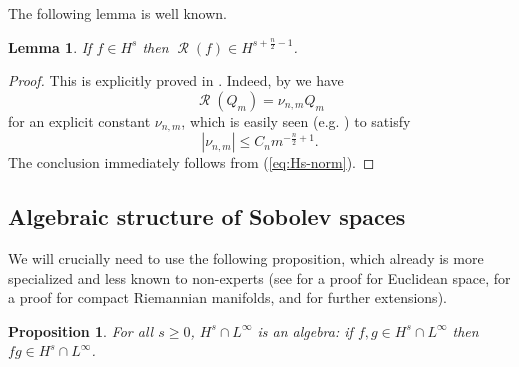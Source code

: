 \documentclass[11pt]{article}
\newtheorem{lemma}[thm]{Lemma}
\newtheorem{proposition}[thm]{Proposition}
\theoremstyle{definition}
\theoremstyle{proof}
\DeclareMathOperator{\+}{\mathop{\tilde{+}}}
\DeclareMathOperator{\Rad}{\mathcal{R}}
\newcommand{\abs}[1]{\left\vert#1\right\vert}
\numberwithin{equation}{section}
\numberwithin{equation}{section}
\begin{document}
\smallskip

The following lemma is well known.
\begin{lemma} \label{lem:R-regularity}
If $f \in H^{s}$ then $\Rad(f) \in H^{s + \frac{n}{2} - 1}$. 
\end{lemma}
\begin{proof}
This is explicitly proved in \cite[Lemma 4.3]{Strichartz}. 
Indeed, by \cite[Lemma 3.4.7]{Groemer} we have 
\[
\Rad(Q_m) = \nu_{n,m} Q_m 
\]
for an explicit constant $\nu_{n,m}$,  
which is easily seen (e.g. \cite[Proof of Lemma 3.4.8]{Groemer}) to satisfy
\[
\abs{\nu_{n,m}} \leq C_n m^{-\frac{n}{2} + 1} .
\]
The conclusion immediately follows from (\ref{eq:Hs-norm}). 
\end{proof}

\subsection{Algebraic structure of Sobolev spaces}

We will crucially need to use the following proposition, which already is more specialized and less known to non-experts (see \cite[Appendix]{KatoPonce-Commutators} for a proof for Euclidean space, \cite[Theorem 25]{CoulhonEtAl-SobolevAlgebras} for a proof for compact Riemannian manifolds, and \cite{BBR-AlgebraSobolevSpaces} for further extensions).
\begin{proposition} \label{prop:algebra}
For all $s \geq 0$, $H^s \cap L^\infty$ is an algebra: if $f, g \in H^s \cap L^\infty$ then $f g \in H^s \cap L^\infty$. 
\end{proposition}
\end{document}
